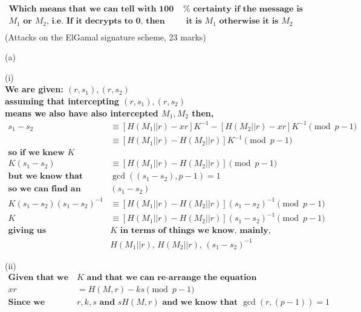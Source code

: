 \documentclass{assignment}
\begin{document}
\begin{flushleft}
\begin{problemlist}
\begin{align*}
\textbf{Which means that we can tell with 100 } &\% \textbf{ certainty if the message is }\\ 
 M_1 \textbf{ or } M_2 \textbf{, i.e. If it decrypts to 0, then } &\textbf{ it is } M_1 \textbf{ otherwise it is } M_2\\
\end{align*}
\pbitem (Attacks on the ElGamal signature scheme, 23 marks)
\item[(a)]
\item[(i)]\hspace{1cm}\\
\hspace{3cm}\bf{We are given:} $(r,s_1), (r,s_2)$\\
\hspace{3cm}\bf{assuming that intercepting }$(r,s_1), (r,s_2)$\\
\hspace{3cm}\bf{means we also have also intercepted }$M_1, M_2$ \bf{then, }\\
\begin{align*}
s_1 - s_2 &\equiv [H(M_1||r) - xr]K^{-1} - [H(M_2||r) - xr]K^{-1} \pmod{p-1}\\
&\equiv [H(M_1||r) - H(M_2||r)]K^{-1} \pmod{p-1}\\
\textbf{so if we knew } K\\
K (s_1 - s_2) &\equiv [H(M_1||r) - H(M_2||r)] \pmod{p-1}\\
\textbf{but we know that } &\gcd{((s_1-s_2),p-1)} = 1\\
\textbf{so we can find an inverse for }&(s_1 - s_2)\\ 
K (s_1 - s_2)(s_1 - s_2)^{-1} &\equiv [H(M_1||r) - H(M_2||r)](s_1 - s_2)^{-1} 
 \pmod{p-1}\\
K &\equiv [H(M_1||r) - H(M_2||r)](s_1 - s_2)^{-1} 
 \pmod{p-1}\\
\textbf{giving us } &K \textbf{ in terms of things we know, mainly, }\\
 &H(M_1||r)\textbf{, }H(M_2||r)\textbf{, }(s_1 - s_2)^{-1}  
\end{align*}
\item[(ii)]\hspace{1cm}\\
\begin{align*}
\textbf{Given that we know } &K \textbf{ and that we can re-arrange the equation}\\
xr & =H(M,r) -ks \pmod{p-1}\\
\textbf{Since we know } &r,k,s \textbf{ and }s H(M,r) \textbf{ and we know that } \gcd(r,(p-1)) = 1\\

\end{align*}
\end{problemlist}
\end{flushleft}
\end{document}
